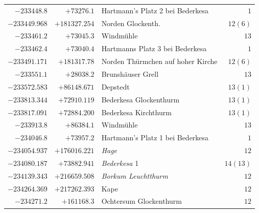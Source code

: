 \begin{center}
\begin{tabular}{r|r|p{170pt}|r}
\(-233448.8\)&\(+73276.1\)&Hartmann’s Platz 2 bei Bederkesa&\(1\)\\
\(-233449.968\)&\(+181327.254\)&Norden Glockenth.&\(12(6)\)\\
\(-233461.2\)&\(+73045.3\)&Windmühle&\(13\)\\
\(-233462.4\)&\(+73040.4\)&Hartmanns Platz 3 bei Bederkesa&\(1\)\\
\(-233491.171\)&\(+181317.78\)&Norden Thürmchen auf hoher Kirche&\(12(6)\)\\
\(-233551.1\)&\(+28038.2\)&Brunshäuser Grell&\(13\)\\
\(-233572.583\)&\(+86148.671\)&Depstedt&\(13(1)\)\\
\(-233813.344\)&\(+72910.119\)&Bederkesa Glockenthurm&\(13(1)\)\\
\(-233817.091\)&\(+72884.200\)&Bederkesa Kirchthurm&\(13(1)\)\\
\(-233913.8\)&\(+86384.1\)&Windmühle&\(13\)\\
\(-234046.8\)&\(+73957.2\)&Hartmann’s Platz 1 bei Bederkesa&\(1\)\\
\(-234054.937\)&\(+176016.221\)&\textit{Hage}&\(12\)\\
\(-234080.187\)&\(+73882.941\)&\textit{Bederkesa} 1&\(14(13)\)\\
\(-234139.343\)&\(+216659.508\)&\textit{Borkum Leuchtthurm}&\(12\)\\
\(-234264.369\)&\(+217262.393\)&Kape&\(12\)\\
\(-234271.2\)&\(+161168.3\)&Ochtersum Glockenthurm&\(12\)\\
\hline\end{tabular}\endgroup\end{center}
\clearpage

